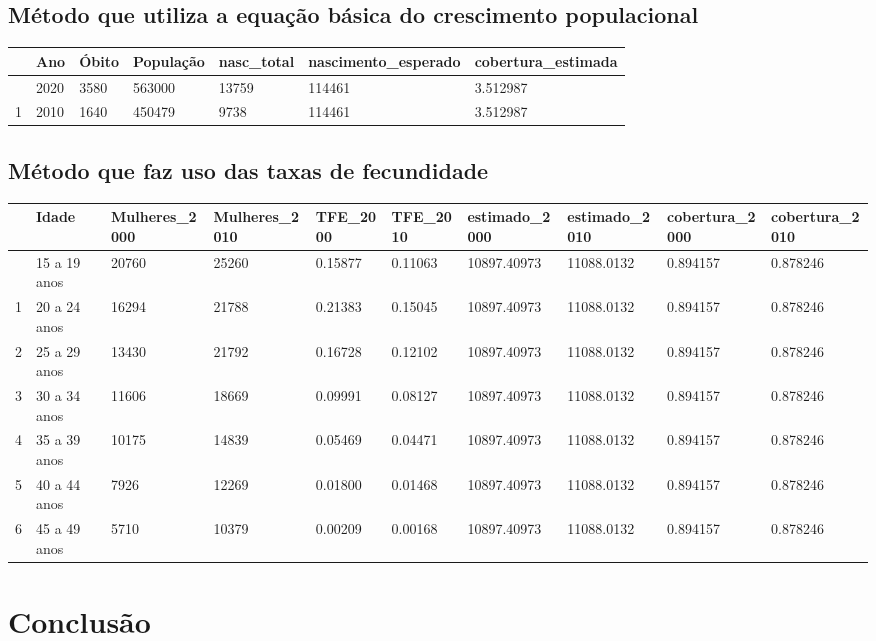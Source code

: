 \documentclass[
  12pt,
  a4paper,
]{scrreprt}
\begin{document}
\subsection{Método que utiliza a equação básica do crescimento
populacional}\label{muxe9todo-que-utiliza-a-equauxe7uxe3o-buxe1sica-do-crescimento-populacional}

\begin{longtable}[]{@{}lllllll@{}}
\toprule\noalign{}
& Ano & Óbito & População & nasc\_total & nascimento\_esperado &
cobertura\_estimada \\
\midrule\noalign{}
\endhead
\bottomrule\noalign{}
\endlastfoot
0 & 2020 & 3580 & 563000 & 13759 & 114461 & 3.512987 \\
1 & 2010 & 1640 & 450479 & 9738 & 114461 & 3.512987 \\
\end{longtable}

\subsection{Método que faz uso das taxas de
fecundidade}\label{muxe9todo-que-faz-uso-das-taxas-de-fecundidade}

\begin{longtable}[]{@{}llllllllll@{}}
\toprule\noalign{}
& Idade & Mulheres\_2000 & Mulheres\_2010 & TFE\_2000 & TFE\_2010 &
estimado\_2000 & estimado\_2010 & cobertura\_2000 & cobertura\_2010 \\
\midrule\noalign{}
\endhead
\bottomrule\noalign{}
\endlastfoot
0 & 15 a 19 anos & 20760 & 25260 & 0.15877 & 0.11063 & 10897.40973 &
11088.0132 & 0.894157 & 0.878246 \\
1 & 20 a 24 anos & 16294 & 21788 & 0.21383 & 0.15045 & 10897.40973 &
11088.0132 & 0.894157 & 0.878246 \\
2 & 25 a 29 anos & 13430 & 21792 & 0.16728 & 0.12102 & 10897.40973 &
11088.0132 & 0.894157 & 0.878246 \\
3 & 30 a 34 anos & 11606 & 18669 & 0.09991 & 0.08127 & 10897.40973 &
11088.0132 & 0.894157 & 0.878246 \\
4 & 35 a 39 anos & 10175 & 14839 & 0.05469 & 0.04471 & 10897.40973 &
11088.0132 & 0.894157 & 0.878246 \\
5 & 40 a 44 anos & 7926 & 12269 & 0.01800 & 0.01468 & 10897.40973 &
11088.0132 & 0.894157 & 0.878246 \\
6 & 45 a 49 anos & 5710 & 10379 & 0.00209 & 0.00168 & 10897.40973 &
11088.0132 & 0.894157 & 0.878246 \\
\end{longtable}

\section{Conclusão}\label{conclusuxe3o}
\end{document}
